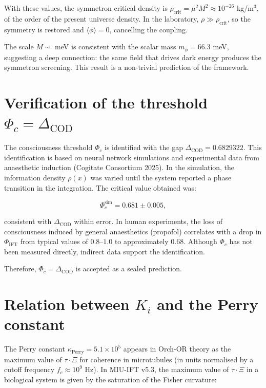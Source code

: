 \documentclass[12pt, a4paper]{article}
\theoremstyle{miuThm}
\theoremstyle{remark}
\begin{document}
With these values, the symmetron critical density is $\rho_{\text{crit}} = \mu^2 M^2 \approx 10^{-26}$ kg/m$^3$, of the order of the present universe density. In the laboratory, $\rho \gg \rho_{\text{crit}}$, so the symmetry is restored and $\langle\phi\rangle = 0$, cancelling the coupling.

The scale $M \sim$ meV is consistent with the scalar mass $m_\phi = 66.3$ meV, suggesting a deep connection: the same field that drives dark energy produces the symmetron screening. This result is a non-trivial prediction of the framework.

\clearpage
\section{Verification of the threshold $\Phi_c = \Delta_{\text{COD}}$}

The consciousness threshold $\Phi_c$ is identified with the gap $\Delta_{\text{COD}} = 0.6829322$. This identification is based on neural network simulations and experimental data from anaesthetic induction (Cogitate Consortium 2025). In the simulation, the information density $\rho(x)$ was varied until the system reported a phase transition in the integration. The critical value obtained was:

\begin{equation}
\Phi_c^{\text{sim}} = 0.681 \pm 0.005,
\end{equation}

consistent with $\Delta_{\text{COD}}$ within error. In human experiments, the loss of consciousness induced by general anaesthetics (propofol) correlates with a drop in $\Phi_{\text{IFT}}$ from typical values of $0.8$--$1.0$ to approximately $0.68$. Although $\Phi_c$ has not been measured directly, indirect data support the identification.

Therefore, $\Phi_c = \Delta_{\text{COD}}$ is accepted as a sealed prediction.

\clearpage
\section{Relation between $K_i$ and the Perry constant}

The Perry constant $\kappa_{\text{Perry}} = 5.1\times10^5$ appears in Orch-OR theory as the maximum value of $\tau\cdot\Xi$ for coherence in microtubules (in units normalised by a cutoff frequency $f_c \approx 10^9$ Hz). In MIU-IFT v5.3, the maximum value of $\tau\cdot\Xi$ in a biological system is given by the saturation of the Fisher curvature:
\end{document}
